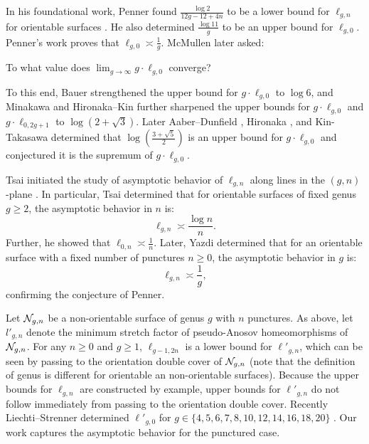  In his foundational work, Penner found $\frac{\log 2}{12g-12+4n}$ to be a lower bound for $\ell_{g,n}$ for orientable surfaces \cite{penner1991bounds}.  He also determined $\frac{\log 11}{g}$ to be an upper bound for $\ell_{g,0}$.  Penner's work proves that $\ell_{g,0}\asymp \frac{1}{g}$.  McMullen  \cite{mcmullen2000polynomial} later asked:
\begin{question}[McMullen]
To what value does $\displaystyle\lim_{g\rightarrow\infty}g\cdot \ell_{g,0}$ converge?
\end{question}
To this end, Bauer \cite{bauer} strengthened the upper bound for $g\cdot \ell_{g,0}$ to $\log 6$, and Minakawa \cite{minakawa} and Hironaka--Kin \cite{HK} further sharpened the upper bounds for $g\cdot \ell_{g,0}$ and $g\cdot \ell_{0,2g+1}$ to $\log(2+\sqrt{3})$.  Later Aaber--Dunfield \cite{AD}, Hironaka \cite{hironaka}, and Kin-Takasawa \cite{KTbounds} determined that $\log\left(\frac{3+\sqrt{5}}{2}\right)$ is an upper bound for $g\cdot \ell_{g,0}$ and conjectured it is the supremum of $g\cdot \ell_{g,0}$.

Tsai initiated the study of asymptotic behavior of $\ell_{g,n}$ along lines in the $(g,n)$-plane \cite{tsai2009asymptotic}.  In particular, Tsai determined that for orientable surfaces of fixed genus $g\geq 2$, the asymptotic behavior in $n$ is:
$$\ell_{g,n}\asymp \frac{\log n}{n}.$$
Further, he showed that $\ell_{0,n}\asymp \frac{1}{n}.$
Later, Yazdi \cite{yazdi2018pseudo} determined that for an orientable surface with a fixed number of punctures $n\geq 0$, the asymptotic behavior in $g$ is:
$$\ell_{g,n}\asymp \frac{1}{g},$$
confirming the conjecture of Penner.

Let $\mathcal{N}_{g,n}$ be a non-orientable surface of genus $g$ with $n$ punctures.  As above, let $l'_{g,n}$ denote the minimum stretch factor of pseudo-Anosov homeomorphisms of $\mathcal{N}_{g,n}$.  For any $n\geq 0$ and $g\geq 1$, $\ell_{g-1,2n}$ is a lower bound for $\ell'_{g,n}$, which can be seen by passing to the orientation double cover of $\mathcal{N}_{g,n}$ (note that the definition of genus is different for orientable an non-orientable surfaces).  Because the upper bounds for $\ell_{g,n}$ are constructed by example, upper bounds for $\ell'_{g,n}$ do not follow immediately from passing to the orientation double cover.  Recently Liechti--Strenner determined $\ell'_{g,0}$ for $g\in\{4,5,6,7,8,10,12,14,16,18,20\}$ \cite{LS}.  Our work captures the asymptotic behavior for the punctured case.

